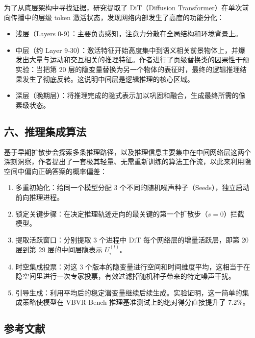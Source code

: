 为了从底层架构中寻找证据，研究提取了 DiT（Diffusion Transformer）在单次前向传播中的层级 token 激活状态，发现网络内部发生了高度的功能分化：

\begin{itemize}
\tightlist
\item
  浅层（Layers 0-9）：主要负责感知，注意力分散在全局结构和环境背景上。
\item
  中层（约 Layer 9-30）：激活特征开始高度集中到语义相关前景物体上，并爆发出大量与运动和交互相关的推理特征。作者进行了页级替换类的因果性干预实验：当把第 20 层的隐变量替换为另一个物体的表征时，最终的逻辑推理结果发生了彻底反转。这说明中间层是逻辑推理的核心区域。
\item
  深层（晚期层）：将推理完成的隐式表示加以巩固和融合，生成最终所需的像素级状态。
\end{itemize}

\hypertarget{ux516dux63a8ux7406ux96c6ux6210ux7b97ux6cd5}{%
\subsection{六、推理集成算法}\label{ux516dux63a8ux7406ux96c6ux6210ux7b97ux6cd5}}

基于早期扩散步会探索多条推理路径，以及推理信息主要集中在中间网络层这两个深刻洞察，作者提出了一套极其轻量、无需重新训练的算法工作流，以此来利用隐空间中偏向正确答案的概率偏差：

\begin{enumerate}
\def\labelenumi{\arabic{enumi}.}
\tightlist
\item
  多重初始化：给同一个模型分配 3 个不同的随机噪声种子（Seeds），独立启动前向推理进程。
\item
  锁定关键步骤：在决定推理轨迹走向的最关键的第一个扩散步（\(s=0\)）拦截模型。
\item
  提取活跃窗口：分别提取 3 个进程中 DiT 每个网络层的增量活跃层，即第 20 层到第 29 层的中间层隐表示 \(U_i^{(l)}\)。
\item
  时空集成投票：对这 3 个版本的隐变量进行空间和时间维度平均，这相当于在隐空间里进行一次专家投票，有效过滤掉随机种子带来的特定噪声干扰。
\item
  引导生成：利用平均后的稳定潜变量继续后续生成。实验证明，这一简单的集成策略使模型在 VBVR-Bench 推理基准测试上的绝对得分直接提升了 7.2\%。
\end{enumerate}

\hypertarget{ux53c2ux8003ux6587ux732e-179}{%
\subsection{参考文献}\label{ux53c2ux8003ux6587ux732e-179}}

